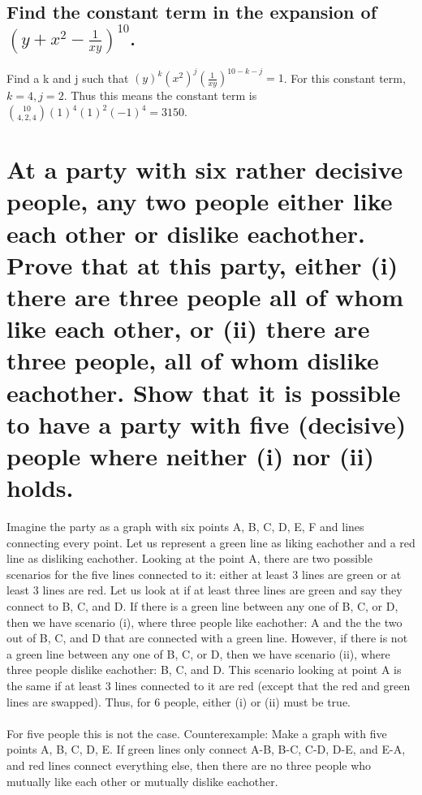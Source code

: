 \documentclass[12pt]{article}
\begin{document}
\subsection{Find the constant term in the expansion of $(y+x^2-\frac{1}{xy})^{10}$.}
Find a k and j such that $(y)^k (x^2)^j (\frac{1}{xy})^{10-k-j} = 1$. For this constant term, $k=4, j=2$.
Thus this means the constant term is $\binom{10}{4,2,4}(1)^4(1)^2(-1)^4 = 3150$.

\setcounter{section}{15}
\section{
    At a party with six rather decisive people, any two people either like each other or dislike eachother.
    Prove that at this party, either (i) there are three people all of whom like each other, or (ii) there are three people,
    all of whom dislike eachother. Show that it is possible to have a party with five (decisive) people where neither (i) nor (ii) holds.
}
Imagine the party as a graph with six points A, B, C, D, E, F and lines connecting every point.
Let us represent a green line as liking eachother and a red line as disliking eachother.
Looking at the point A, there are two possible scenarios for the five lines connected to it: either at least 3 lines are green or at least 3 lines are red.
Let us look at if at least three lines are green and say they connect to B, C, and D.
If there is a green line between any one of B, C, or D, then we have scenario (i), where three people like eachother: 
A and the the two out of B, C, and D that are connected with a green line.
However, if there is not a green line between any one of B, C, or D, then we have scenario (ii), where three people dislike eachother:
B, C, and D.
This scenario looking at point A is the same if at least 3 lines connected to it are red (except that the red and green lines are swapped).
Thus, for 6 people, either (i) or (ii) must be true.\\\\
For five people this is not the case. Counterexample: Make a graph with five points A, B, C, D, E.
If green lines only connect A-B, B-C, C-D, D-E, and E-A, and red lines connect everything else, then there are no three
people who mutually like each other or mutually dislike eachother.
\end{document}
